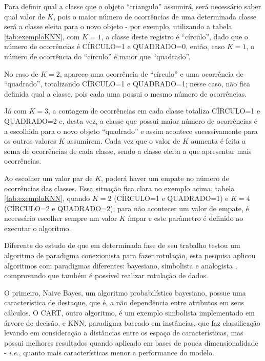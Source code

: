  
Para definir qual a classe que o objeto ``triangulo'' assumirá, será necessário saber qual valor de ${K}$, pois o maior número de ocorrências de uma determinada classe será a classe eleita para o novo objeto - por exemplo, utilizando a tabela \ref{tab:exemploKNN}, com ${K=1}$, a classe deste registro é “círculo”, dado que o número de ocorrências é CÍRCULO=1 e QUADRADO=0, então, caso ${K=1}$, o número de ocorrência do “círculo” é maior que ``quadrado''. 

No caso de ${K=2}$, aparece uma ocorrência de “círculo” e uma ocorrência de “quadrado”, totalizando CÍRCULO=1 e QUADRADO=1; nesse caso, não fica definida qual a classe, pois cada uma possui o mesmo número de ocorrências. 

Já com ${K=3}$, a contagem de ocorrências em cada classe totaliza CÍRCULO=1 e QUADRADO=2 e, desta vez, a classe que possui maior número de ocorrências é a escolhida para o novo objeto ``quadrado'' e assim acontece sucessivamente para os outros valores ${K}$ assumirem. Cada vez que o valor de ${K}$ aumenta é feita a soma de ocorrências de cada classe, sendo a classe eleita a que apresentar mais ocorrências. 
 

Ao escolher um valor par de ${K}$, poderá haver um empate no número de ocorrências das classes. Essa situação fica clara no exemplo acima, tabela \ref{tab:exemploKNN}, quando ${K=2}$  (CÍRCULO=1 e QUADRADO=1) e ${K=4}$  (CÍRCULO=2 e QUADRADO=2); para não acontecer um valor de empate, é necessário escolher sempre um valor ${K}$ ímpar e este parâmetro é definido ao executar o algoritmo. 

Diferente do estudo de   que em determinada fase de seu trabalho testou um algoritmo de paradigma conexionista para fazer rotulação, esta pesquisa aplicou algoritmos com paradigmas diferentes: bayesiano, simbolista e analogista  , comprovando que também é possível realizar rotulação de dados.


O primeiro, Naive Bayes, um algoritmo probabilístico bayesiano, possue uma característica de destaque, que é, a não dependência entre atributos em seus cálculos. O CART, outro algoritmo, é um exemplo simbolista implementado em árvore de decisão, e KNN, paradigma baseado em instâncias, que faz classificação levando em consideração a distâncias entre os espaço de características, mas possui melhores resultados quando aplicado em bases de pouca dimensionalidade - \textit{i.e.}, quanto mais características menor a performance do modelo.

